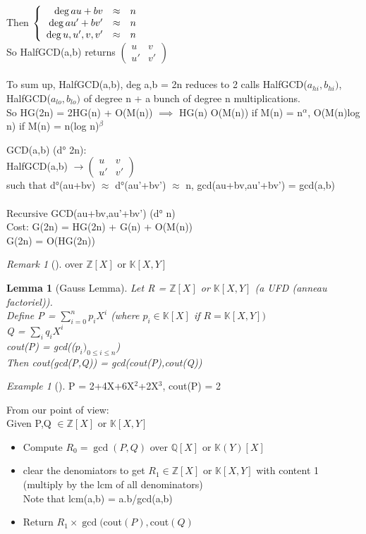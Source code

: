 \documentclass{article}
\newtheorem{lemma}{Lemma}
\theoremstyle{definition}
\theoremstyle{remark}
\newtheorem*{remark}{Remark}
\newtheorem*{example}{Example}
\newcommand{\Ex}[3]{\begin{example}[#1]\label{#2}#3\end{example}}
\newcommand{\Lem}[3]{\begin{lemma}[#1]\label{#2}#3\end{lemma}}
\newcommand{\Rem}[3]{\begin{remark}[#1]\label{#2}#3\end{remark}}
\newcommand{\Z}{\mathbb{Z}}
\newcommand{\K}{\mathbb{K}}
\newcommand{\Q}{\mathbb{Q}}
\begin{document}
Then $\left\{\begin{array}{r c l}
\deg au+bv & \approx & n\\
\deg au'+bv' & \approx & n\\
\deg u,u',v,v' & \approx & n
\end{array}\right .$\\
So HalfGCD(a,b) returns $\begin{pmatrix}
u&v\\u'&v'
\end{pmatrix}$\\\\

To sum up, HalfGCD(a,b), deg a,b = 2n reduces to 2 calls HalfGCD($a_{hi},b_{hi})$, HalfGCD($a_{lo},b_{lo})$ of degree n + a bunch of degree n multiplications.\\
So HG(2n) = 2HG(n) + O(M(n)) $ \implies$ HG(n) O(M(n)) if M(n) = n$^\alpha$, O(M(n)log n) if M(n) = n(log n)$^\beta$

GCD(a,b) (d° 2n):\\
HalfGCD(a,b) $\rightarrow \begin{pmatrix}
u&v\\u'&v'
\end{pmatrix}$\\
such that d°(au+bv) $\approx$ d°(au'+bv') $\approx$ n, gcd(au+bv,au'+bv') = gcd(a,b)\\\\
Recursive GCD(au+bv,au'+bv') (d° n)\\

Cost: G(2n) = HG(2n) + G(n) + O(M(n))\\
G(2n) = O(HG(2n))

\Rem{}{}{over $\Z[X]$ or $\K[X,Y]$}

\Lem{Gauss Lemma}{}{Let R = $\Z[X]$ or $\K[X,Y]$ (a UFD (anneau factoriel)).\\
	Define P = $\sum\limits_{i=0}^n p_iX^i$ (where $p_i \in \K[X]$ if $R = \K[X,Y])$\\
	Q =  $\sum\limits_{i} q_iX^i$\\
	cout(P) = gcd(($p_i)_{0\leq i\leq n}$)\\
	Then cout(gcd(P,Q)) = gcd(cout(P),cout(Q))}

\Ex{}{}{P = 2+4X+6X$^2$+2X$^3$, cout(P) = 2}

From our point of view:\\
Given P,Q $\in \Z[X]$ or $\K[X,Y]$\begin{itemize}
	\item Compute $R_0 = \gcd(P,Q)$ over $\Q[X]$ or $\K(Y)[X]$
	\item clear the denomiators to get $R_1 \in \Z[X]$ or $\K[X,Y]$ with content 1 (multiply by the lcm of all denominators)\\
	Note that lcm(a,b) = a.b/gcd(a,b)
	\item Return $R_1\times\gcd($cout$(P),$cout$(Q)$
\end{itemize}
\end{document}
